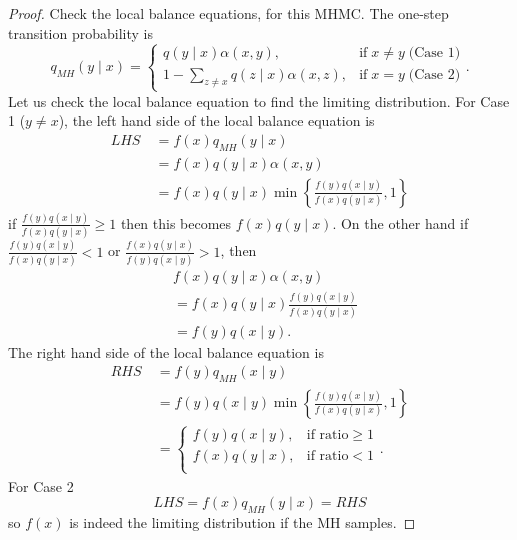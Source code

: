 \begin{proof}
    Check the local balance equations, for this MHMC. The one-step transition probability is
    \[
        q_{MH} (y \mid x) = \left\{
        \begin{matrix}
            q(y \mid x) \alpha (x,y) ,                     & \text{if} \; x \neq y \; \text{(Case 1)} \\
            1 - \sum_{z \neq x} q(z \mid x) \alpha (x,z) , & \text{if} \; x = y \; \text{(Case 2)}
        \end{matrix}
        \right. .
    \]
    Let us check the local balance equation to find the limiting distribution. For Case 1 ($y \neq x$), the left hand side of the local balance equation is
    \begin{align*}
        LHS \
         & = f(x) q_{MH} (y \mid x)        \\
         & = f(x) q(y \mid x) \alpha (x,y) \\
         & = f(x) q(y \mid x) \min \left\{
        \frac{f(y) q(x \mid y)}{f(x) q(y \mid x)} , 1
        \right\}
    \end{align*}
    if $\frac{f(y) q(x \mid y)}{f(x) q(y \mid x)} \geq 1$ then this becomes $f(x) q(y \mid x)$. On the other hand if $\frac{f(y) q(x \mid y)}{f(x) q(y \mid x)} < 1$ or $\frac{f(x) q(y \mid x)}{f(y) q(x \mid y)} > 1$, then
    \begin{align*}
         & f(x) q(y \mid x) \alpha (x,y)                                \\
         & = f(x) q(y \mid x) \frac{f(y) q(x \mid y)}{f(x) q(y \mid x)} \\
         & = f(y) q(x \mid y).
    \end{align*}
    The right hand side of the local balance equation is
    \begin{align*}
        RHS \
         & = f(y) q_{MH} (x \mid y)        \\
         & = f(y) q(x \mid y) \min \left\{
        \frac{f(y) q(x \mid y)}{f(x) q(y \mid x)} , 1
        \right\}                           \\
         & = \left\{
        \begin{matrix}
            f(y) q(x \mid y) , & \text{if ratio} \geq 1 \\
            f(x) q(y \mid x) , & \text{if ratio} < 1    \\
        \end{matrix}
        \right. .
    \end{align*}
    For Case 2
    \[
        LHS = f(x) q_{MH} (y \mid x) = RHS
    \]
    so $f(x)$ is indeed the limiting distribution if the MH samples.
\end{proof}

